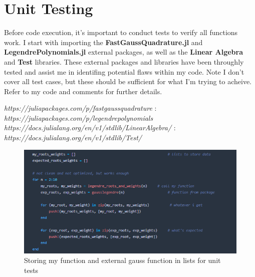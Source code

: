 \documentclass[twoside]{article}
\begin{document}
\newpage




\section{Unit Testing}
Before code execution, it's important to conduct tests to verify all functions work. I start with importing the \textbf{FastGaussQuadrature.jl} and \textbf{LegendrePolynomials.jl} external packages, as well as the \textbf{Linear Algebra} and \textbf{Test} libraries. These external packages and libraries have been throughly tested and assist me in identifing potential flaws within my code. Note I don't cover all test cases, but these should be sufficient for what I'm trying to acheive. Refer to my code and comments for further details.

\textit{https://juliapackages.com/p/fastgaussquadrature} :  \textit{https://juliapackages.com/p/legendrepolynomials}\\
\textit{https://docs.julialang.org/en/v1/stdlib/LinearAlgebra/} : \textit{https://docs.julialang.org/en/v1/stdlib/Test/}


\begin{figure}[ht]
\centering
\includegraphics[scale=0.6]{img/store-all-data.png}
\caption{Storing my function and external gauss function in lists for unit tests}
\end{figure}
\end{document}
